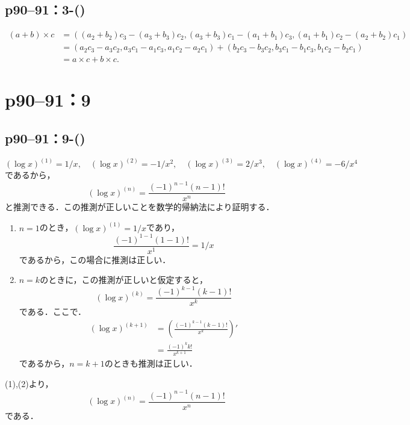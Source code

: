\subsection*{p90--91：3-()} \label{p90--91：3-(\romannumeral5)}

\begin{tproof}
  \begin{align*}
    (a + b) \times c & = ( (a_2 + b_2) c_3 - (a_3 + b_3) c_2, (a_3 + b_3) c_1 - (a_1 + b_1) c_3, (a_1 + b_1) c_2 - (a_2 + b_2) c_1 ) \\
                     & =(a_2 c_3-a_3 c_2, a_3 c_1-a_1 c_3, a_1 c_2-a_2 c_1) + (b_2 c_3-b_3 c_2, b_3 c_1-b_1 c_3, b_1 c_2-b_2 c_1)    \\
                     & = a \times c + b \times c.
  \end{align*}
\end{tproof}

\section*{p90--91：9}

\subsection*{p90--91：9-()}

\begin{tanswer}
  \[
    ( \log x )^{(1)}= 1/x , \quad (\log x)^{(2)} = - 1/x^2 , \quad (\log x)^{(3)} = 2/x^3,\quad (\log x)^{(4)} = - 6 /x^4
  \]
  であるから，
  \[
    (\log x)^{(n)} = \frac{(-1)^{n-1}  (n-1)!}{x^n}
  \]
  と推測できる．この推測が正しいことを数学的帰納法により証明する．
  \begin{enumerate}
    \item $n=1$のとき，$(\log x)^{(1)} = 1/x$であり，
          \[
            \frac{(-1)^{1-1}  (1-1)!}{x^1}=1/x
          \]
          であるから，この場合に推測は正しい．
    \item $n=k$のときに，この推測が正しいと仮定すると，
          \[
            (\log x)^{(k)} = \frac{(-1)^{k-1}  (k-1)!}{x^k}
          \]
          である．ここで．
          \begin{align*}
            (\log x)^{(k+1)} & = \left (\frac{(-1)^{k-1}  (k-1)!}{x^k} \right ) ' \\
                             & = \frac{(-1)^k  k!}{x^{k+1}}
          \end{align*}
          であるから，$n=k+1$のときも推測は正しい．
  \end{enumerate}
  (1),(2)より，
  \[
    (\log x)^{(n)} = \frac{(-1)^{n-1}  (n-1)!}{x^n}
  \]
  である．
\end{tanswer}

